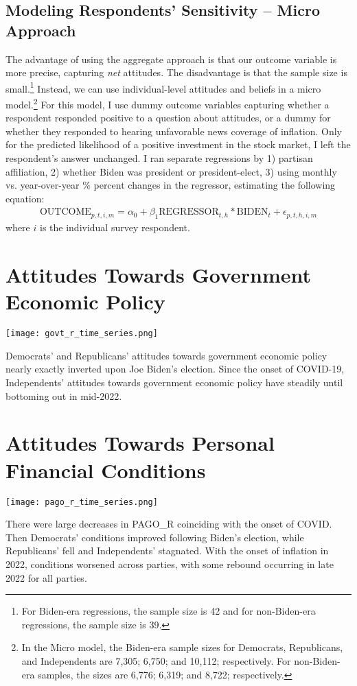 \documentclass{article}
\begin{document}
\subsection{Modeling Respondents' Sensitivity -- Micro Approach}
The advantage of using the aggregate approach is that our outcome variable is more precise, capturing \textit{net} attitudes. The disadvantage is that the sample size is small.\footnote{For Biden-era regressions, the sample size is 42 and for non-Biden-era regressions, the sample size is 39.} Instead, we can use individual-level attitudes and beliefs in a micro model.\footnote{In the Micro model, the Biden-era sample sizes for Democrats, Republicans, and Independents are 7,305; 6,750; and 10,112; respectively. For non-Biden-era samples, the sizes are 6,776; 6,319; and 8,722; respectively.} For this model, I use dummy outcome variables capturing whether a respondent responded positive to a question about attitudes, or a dummy for whether they responded to hearing unfavorable news coverage of inflation. Only for the predicted likelihood of a positive investment in the stock market, I left the respondent's answer unchanged. I ran separate regressions by 1) partisan affiliation,  2) whether Biden was president or president-elect, 3) using monthly vs. year-over-year \% percent changes in the regressor, estimating the following equation: 
\begin{gather} 
	\text{OUTCOME}_{p,t,i,m} = \alpha_0 + \beta_1 \text{REGRESSOR}_{t,h} *\text{BIDEN}_t + \epsilon_{p,t,h,i,m}
\end{gather} 
where $i$ is the individual survey respondent. 

\section{Attitudes Towards Government Economic Policy}
\centering \texttt{[image: govt\_r\_time\_series.png]}\\
\raggedright Democrats' and Republicans' attitudes towards government economic policy nearly exactly inverted upon Joe Biden's election. Since the onset of COVID-19, Independents' attitudes towards government economic policy have steadily until bottoming out in mid-2022.

\section{Attitudes Towards Personal Financial Conditions}
\centering \texttt{[image: pago\_r\_time\_series.png]}\\
\raggedright There were large decreases in PAGO\_R coinciding with the onset of COVID. Then Democrats' conditions improved following Biden's election, while Republicans' fell and Independents' stagnated. With the onset of inflation in 2022, conditions worsened across parties, with some rebound occurring in late 2022 for all parties.
\end{document}
